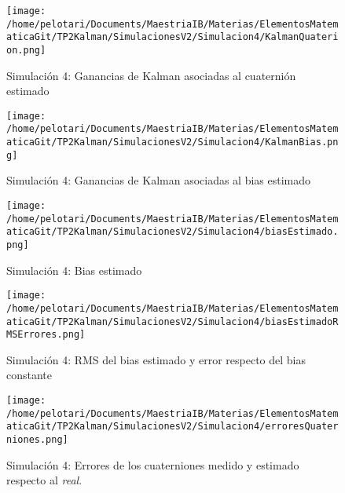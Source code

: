 \documentclass[a4paper,11pt,twoside]{IT-CNEA}
\begin{document}
\begin{figure}[h!]
\centering
\texttt{[image: /home/pelotari/Documents/MaestriaIB/Materias/ElementosMatematicaGit/TP2Kalman/SimulacionesV2/Simulacion4/KalmanQuaterion.png]}
\caption{Simulación 4:  Ganancias de Kalman asociadas al cuaternión estimado}
\label{fig:Simulacion4/KalmanQuaterion}
\end{figure}
\begin{figure}[h!]
\centering
\texttt{[image: /home/pelotari/Documents/MaestriaIB/Materias/ElementosMatematicaGit/TP2Kalman/SimulacionesV2/Simulacion4/KalmanBias.png]}
\caption{Simulación 4:  Ganancias de Kalman asociadas al bias estimado}
\label{fig:Simulacion4/KalmanBias}
\end{figure}
\begin{figure}[h!]
\centering
\texttt{[image: /home/pelotari/Documents/MaestriaIB/Materias/ElementosMatematicaGit/TP2Kalman/SimulacionesV2/Simulacion4/biasEstimado.png]}
\caption{Simulación 4:  Bias estimado}
\label{fig:Simulacion4/biasEstimado}
\end{figure}
\begin{figure}[h!]
\centering
\texttt{[image: /home/pelotari/Documents/MaestriaIB/Materias/ElementosMatematicaGit/TP2Kalman/SimulacionesV2/Simulacion4/biasEstimadoRMSErrores.png]}
\caption{Simulación 4:  RMS del bias estimado y error respecto del bias constante}
\label{fig:Simulacion4/biasEstimadoRMSErrores}
\end{figure}
\begin{figure}[h!]
\centering
\texttt{[image: /home/pelotari/Documents/MaestriaIB/Materias/ElementosMatematicaGit/TP2Kalman/SimulacionesV2/Simulacion4/erroresQuaterniones.png]}
\caption{Simulación 4:  Errores de los cuaterniones medido y estimado respecto al \textit{real}.}
\label{fig:Simulacion4/erroresQuaterniones}
\end{figure}
\end{document}
